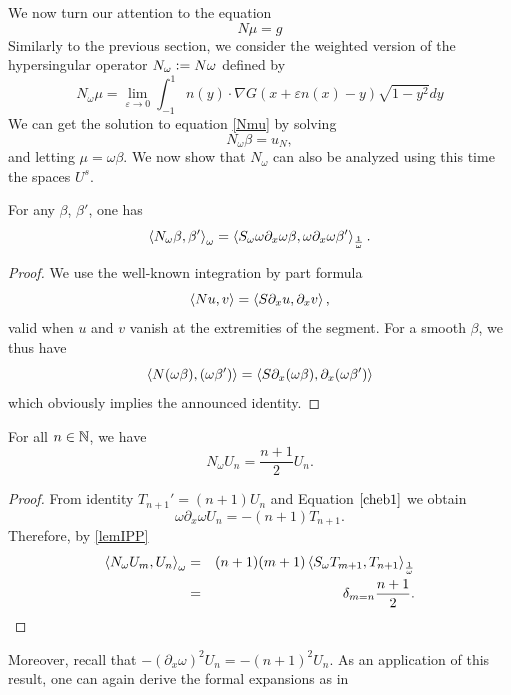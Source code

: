 \documentclass[a4paper]{article}
\begin{document}
We now turn our attention to the equation 
\begin{equation}
N\mu = g
\label{Nmu}
\end{equation} 
\noindent Similarly to the previous section, we consider the weighted version of the hypersingular operator $N_\omega \mathrel{\mathop:}= N \omega$ defined by
\[N_\omega \mu = \lim_{\varepsilon\to 0}\int_{-1}^{1} n(y)\cdot\nabla G(x + \varepsilon n(x) - y) \sqrt{1-y^2} dy\]
We can get the solution to equation \eqref{Nmu} by solving 
\begin{equation}
	N_\omega \beta = u_N,
	\label{Nomegabeta}
\end{equation}
and letting $\mu = \omega \beta$. 
We now show that $N_\omega$ can also be analyzed using this time the spaces $U^s$. 
\begin{Lem}
	\label{lemIPP}
	For any $\beta$, $\beta'$, one has 
	\[\left\langle N_\omega \beta, \beta'\right\rangle_\omega = \left\langle S_\omega \omega \partial_x \omega \beta,\omega \partial_x \omega \beta'\right\rangle_\frac{1}{\omega}.\]
	\begin{proof}
		 We use the well-known integration by part formula
		\[\left\langle N u,v\right\rangle = \left\langle S\partial_x u,\partial_x v\right\rangle,\]
		valid when $u$ and $v$ vanish at the extremities of the segment. 
		For a smooth $\beta$, we thus have
		\[ \left\langle N (\omega \beta), (\omega \beta')\right\rangle = \left\langle S \partial_x(\omega \beta),\partial_x (\omega \beta')\right\rangle\] 
		which obviously implies the announced identity. 
	\end{proof}
\end{Lem}
\begin{Lem}
	For all $n \in \mathbb{N}$, we have 
	\[N_\omega U_n = \frac{n+1}{2}U_n.\]	
	\label{NUn}
\end{Lem}
\begin{proof}
	From identity $T_{n+1}' = (n+1)U_n$ and Equation $\eqref{cheb1}$ we obtain
	\begin{equation*}
	\omega \partial_x \omega U_n = -(n+1) T_{n+1}.
	\end{equation*}
	Therefore, by \autoref{lemIPP}
	\begin{eqnarray*}
		\left\langle N_\omega U_m,U_n\right\rangle_\omega & = & (n+1)(m+1)\left\langle S_\omega T_{m+1},T_{n+1}\right\rangle_\frac{1}{\omega}\\
		&=& \delta_{m=n} \frac{n+1}{2}.	
	\end{eqnarray*}
\end{proof}
Moreover, recall that $-(\partial_x\omega)^2 U_n = -(n+1)^2 U_n.$ As an application of this result, one can again derive the formal expansions as in \cite{jerez2012explicit}
\end{document}
